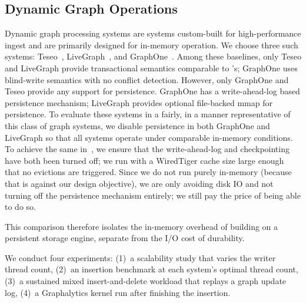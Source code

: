\subsection{Dynamic Graph Operations}
\label{sec:eval:dynamic}

Dynamic graph processing systems are systems custom-built for high-performance ingest and are primarily designed for in-memory operation.
We choose three such systems: Teseo~\cite{teseo2021deLeo}, LiveGraph~\cite{zhu2019livegraph}, and GraphOne~\cite{graphone2019kumar}.
Among these baselines, only Teseo and LiveGraph provide transactional semantics
comparable to \project{}'s; GraphOne uses blind-write semantics with no
conflict detection.
However, only GraphOne and Teseo provide any support for persistence.
GraphOne has a write-ahead-log based persistence mechanism; LiveGraph provides optional file-backed mmap for persistence.
To evaluate these systems in a fairly, in a manner representative of this class of graph systems, we disable persistence in both GraphOne and LiveGraph so that all systems operate under comparable in-memory conditions.
To achieve the same in~\project{}, we ensure that the write-ahead-log and checkpointing have both been turned off; we run with a WiredTiger cache size large enough that no evictions are triggered.
Since we do not run \project{} purely in-memory (because that is against our design objective), we are only avoiding disk IO and not turning off the persistence mechanism entirely; we still pay the price of being able to do so.


This comparison therefore isolates the in-memory overhead of building on
a persistent storage engine, separate from the I/O cost of durability.

We conduct four experiments:
(1)~a scalability study that varies the writer thread count,
(2)~an insertion benchmark at each system's optimal thread count, 
(3)~a sustained mixed insert-and-delete workload that replays a graph update log, 
(4)~a Graphalytics kernel run after finishing the insertion.